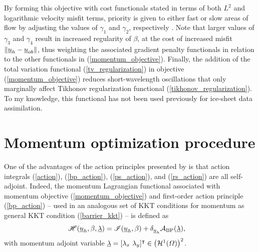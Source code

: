 By forming this objective with cost functionals stated in terms of both $L^2$ and logarithmic velocity misfit terms, priority is given to either fast or slow areas of flow by adjusting the values of $\gamma_1$ and $\gamma_2$, respectively \citep{morlighem_2013}.  Note that larger values of $\gamma_3$ and $\gamma_4$ result in increased regularity of $\beta$, at the cost of increased misfit $\left\Vert \underline{u}_h - \underline{u}_{ob} \right\Vert$, thus weighting the associated gradient penalty functionals in relation to the other functionals in (\ref{momentum_objective}).  Finally, the addition of the total variation functional (\ref{tv_regularization}) in objective (\ref{momentum_objective}) reduces short-wavelength oscillations that only marginally affect Tikhonov regularization functional (\ref{tikhonov_regularization}).  To my knowledge, this functional has not been used previously for ice-sheet data assimilation.


\section{Momentum optimization procedure} \label{ssn_momentum_optimization_procedure}

One of the advantages of the action principles presented by \citet{dukowicz_2010} is that action integrals (\ref{action}), (\ref{bp_action}), (\ref{ps_action}), and (\ref{rs_action}) are all self-adjoint.  Indeed, the momentum  Lagrangian functional associated with momentum objective (\ref{momentum_objective}) and first-order action principle (\ref{bp_action}) -- used in an analogous set of KKT conditions for momentum as general KKT condition (\ref{barrier_kkt}) -- is defined as
\begin{align}
  \label{momentum_lagrangian}
  \mathscr{H}(\underline{u}_h, \beta, \underline{\lambda}) &= \mathscr{I}(\underline{u}_h, \beta) + \delta_{\underline{u}_h} \mathcal{A}_{\text{BP}}(\underline{\lambda}),
\end{align}
with momentum adjoint variable  $\rankone{\lambda} = [\lambda_x\ \lambda_y]^\intercal \in \left( \mathcal{H}^1(\Omega) \right)^2$.

